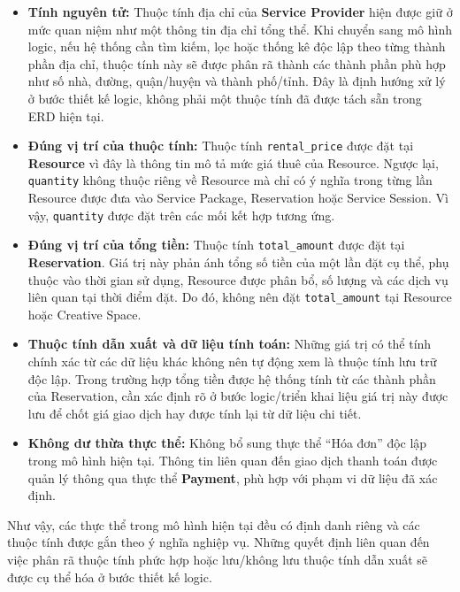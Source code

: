 \begin{itemize}

\item \textbf{Tính nguyên tử:} Thuộc tính địa chỉ của \textbf{Service Provider} hiện được giữ ở mức quan niệm như một thông tin địa chỉ tổng thể. Khi chuyển sang mô hình logic, nếu hệ thống cần tìm kiếm, lọc hoặc thống kê độc lập theo từng thành phần địa chỉ, thuộc tính này sẽ được phân rã thành các thành phần phù hợp như số nhà, đường, quận/huyện và thành phố/tỉnh. Đây là định hướng xử lý ở bước thiết kế logic, không phải một thuộc tính đã được tách sẵn trong ERD hiện tại.

\item \textbf{Đúng vị trí của thuộc tính:} Thuộc tính \texttt{rental\_price} được đặt tại \textbf{Resource} vì đây là thông tin mô tả mức giá thuê của Resource. Ngược lại, \texttt{quantity} không thuộc riêng về Resource mà chỉ có ý nghĩa trong từng lần Resource được đưa vào Service Package, Reservation hoặc Service Session. Vì vậy, \texttt{quantity} được đặt trên các mối kết hợp tương ứng.

\item \textbf{Đúng vị trí của tổng tiền:} Thuộc tính \texttt{total\_amount} được đặt tại \textbf{Reservation}. Giá trị này phản ánh tổng số tiền của một lần đặt cụ thể, phụ thuộc vào thời gian sử dụng, Resource được phân bổ, số lượng và các dịch vụ liên quan tại thời điểm đặt. Do đó, không nên đặt \texttt{total\_amount} tại Resource hoặc Creative Space.

\item \textbf{Thuộc tính dẫn xuất và dữ liệu tính toán:} Những giá trị có thể tính chính xác từ các dữ liệu khác không nên tự động xem là thuộc tính lưu trữ độc lập. Trong trường hợp tổng tiền được hệ thống tính từ các thành phần của Reservation, cần xác định rõ ở bước logic/triển khai liệu giá trị này được lưu để chốt giá giao dịch hay được tính lại từ dữ liệu chi tiết.

\item \textbf{Không dư thừa thực thể:} Không bổ sung thực thể ``Hóa đơn'' độc lập trong mô hình hiện tại. Thông tin liên quan đến giao dịch thanh toán được quản lý thông qua thực thể \textbf{Payment}, phù hợp với phạm vi dữ liệu đã xác định.

\end{itemize}

Như vậy, các thực thể trong mô hình hiện tại đều có định danh riêng và các thuộc tính được gắn theo ý nghĩa nghiệp vụ. Những quyết định liên quan đến việc phân rã thuộc tính phức hợp hoặc lưu/không lưu thuộc tính dẫn xuất sẽ được cụ thể hóa ở bước thiết kế logic.

